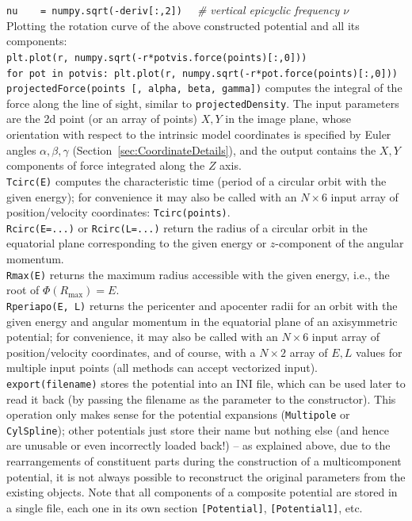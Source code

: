 \documentclass[12pt]{article}
\newcommand{\ppp}[1]{\textcolor{darkolive} {\texttt{#1}}}
\begin{document}
\texttt{nu~~~~= numpy.sqrt(-deriv[:,2])}
\textit{\color{Sepia} \ \ \# vertical epicyclic frequency $\nu$} \\[1mm]
Plotting the rotation curve of the above constructed potential and all its components:\\
\texttt{plt.plot(r, numpy.sqrt(-r*potvis.force(points)[:,0]))}\\
\texttt{for pot in potvis: plt.plot(r, numpy.sqrt(-r*pot.force(points)[:,0]))}\\[2mm]
\texttt{projectedForce(points [, alpha, beta, gamma])} computes the integral of the force along the line of sight, similar to \texttt{projectedDensity}. The input parameters are the 2d point (or an array of points) $X,Y$ in the image plane, whose orientation with respect to the intrinsic model coordinates is specified by Euler angles $\alpha, \beta, \gamma$ (Section~\ref{sec:CoordinateDetails}), and the output contains the $X,Y$ components of force integrated along the $Z$ axis.\\[2mm]
\texttt{Tcirc(E)} computes the characteristic time (period of a circular orbit with the given energy); for convenience it may also be called with an $N\times6$ input array of position/velocity coordinates: \texttt{Tcirc(points)}.\\[2mm]
\texttt{Rcirc(E=...)} or \texttt{Rcirc(L=...)} return the radius of a circular orbit in the equatorial plane corresponding to the given energy or $z$-component of the angular momentum.\\[2mm]
\texttt{Rmax(E)} returns the maximum radius accessible with the given energy, i.e., the root of $\Phi(R_\mathrm{max})=E$.\\[2mm]
\texttt{Rperiapo(E, L)} returns the pericenter and apocenter radii for an orbit with the given energy and angular momentum in the equatorial plane of an axisymmetric potential; for convenience, it may also be called with an $N\times6$ input array of position/velocity coordinates, and of course, with a $N\times2$ array of $E,L$ values for multiple input points (all methods can accept vectorized input).
\texttt{export(filename)} stores the potential into an INI file, which can be used later to read it back (by passing the filename as the parameter to the constructor). This operation only makes sense for the potential expansions (\ppp{Multipole} or \ppp{CylSpline}); other potentials just store their name but nothing else (and hence are unusable or even incorrectly loaded back!) -- as explained above, due to the rearrangements of constituent parts during the construction of a multicomponent potential, it is not always possible to reconstruct the original parameters from the existing objects. Note that all components of a composite potential are stored in a single file, each one in its own section \texttt{[Potential]}, \texttt{[Potential1]}, etc.
\end{document}
